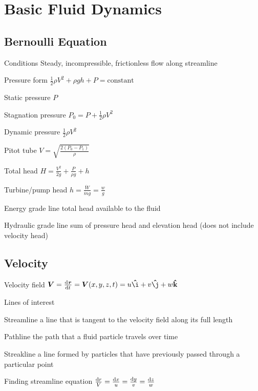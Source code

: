 \documentclass{article}
\begin{document}
\section{Basic Fluid Dynamics}

\subsection{Bernoulli Equation}
\label{sec:bernoulli-eq}
\begin{description*}
\item[Conditions] Steady, incompressible, frictionless flow along streamline
\item[Pressure form]
  \(\frac{1}{2}\rho V^2 + \rho g h + P = \text{constant}\)
\item[Static pressure]
  \(P\)
\item[Stagnation pressure]
  \(P_0 = P + \frac{1}{2}\rho V^2\)
\item[Dynamic pressure]
  \(\frac{1}{2}\rho V^2\)
\item[Pitot tube]
  \(V = \sqrt{\frac{2\left(P_0-P_1\right)}{\rho}}\)
\item[Total head]
  \(H = \frac{V^2}{2g} + \frac{P}{\rho g} + h\)
\item[Turbine\slash{}pump head]
  \(h = \frac{\dot{W}}{\dot{m} g} = \frac{w}{g}\)
\item[Energy grade line] total head available to the fluid
\item[Hydraulic grade line] sum of pressure head and elevation head (does not include velocity head)
\end{description*}

\subsection{Velocity}
\begin{description*}
\item[Velocity field]
  \(\vec{V} = \od{\vec{r}}{t} = \vec{V}(x,y,z,t)
  = u\uvec{\mathrm{\i}}+v\uvec{\mathrm{\j}} + w\uvec{\mathrm{k}}\)
\item[Lines of interest]~
  \begin{description*}
  \item[Streamline] a line that is tangent to the velocity field along its full length
  \item[Pathline] the path that a fluid particle travels over time
  \item[Streakline] a line formed by particles that have previously passed through a particular point
  \end{description*}
\item[Finding streamline equation]
  \(\frac{\dif r}{V} = \frac{\dif x}{u} = \frac{\dif y}{v} = \frac{\dif z}{w}\)
\end{description*}
\end{document}
